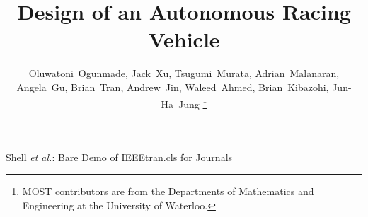 \documentclass[11pt,journal]{IEEEtran}
\begin{document}
%
\title{Design of an Autonomous Racing Vehicle}
%
%
%

\author{Oluwatoni~Ogunmade, Jack~Xu, Tsugumi~Murata, Adrian~Malanaran,  Angela~Gu, Brian~Tran, Andrew~Jin, Waleed~Ahmed, Brian~Kibazohi, Jun-Ha~Jung
\thanks{MOST contributors are from the Departments of Mathematics and Engineering at the University of Waterloo.}}

% 
%



%
{Shell \MakeLowercase{\textit{et al.}}: Bare Demo of IEEEtran.cls for Journals}
% 
\end{document}
